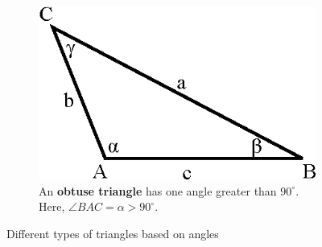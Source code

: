 \documentclass[11pt]{article}
\begin{document}
\begin{figure}[!htbp]
    ~
    \begin{subfigure}[t]{0.3\textwidth}
        \centering
        \includegraphics[scale=0.7]{obtuse_triangle.eps}
        \caption{An \textbf{obtuse triangle} has one angle greater than $90^\circ$. Here, $\angle BAC = \alpha > 90^\circ$.}
        \label{fig:obtuse_triangle}
    \end{subfigure}
    \caption{Different types of triangles based on angles}
\end{figure}
\FloatBarrier
\end{document}

